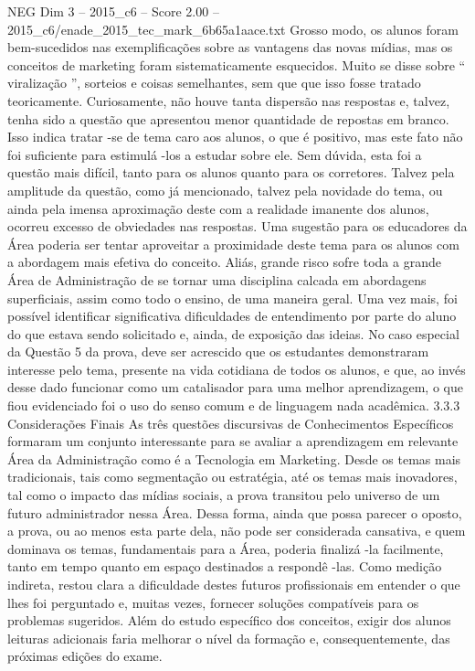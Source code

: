 \begin{textsample}{NEG Dim 3 – 2015\_c6 – Score 2.00 – 2015\_c6/enade\_2015\_tec\_mark\_6b65a1aace.txt}
Grosso modo, os alunos foram bem-sucedidos nas exemplificações sobre as vantagens das novas mídias, mas os conceitos de marketing foram sistematicamente esquecidos.
Muito se disse sobre “ viralização ”, sorteios e coisas semelhantes, sem que que isso fosse tratado teoricamente.
Curiosamente, não houve tanta dispersão nas respostas e, talvez, tenha sido a questão que apresentou menor quantidade de repostas em branco.
Isso indica tratar -se de tema caro aos alunos, o que é positivo, mas este fato não foi suficiente para estimulá -los a estudar sobre ele.
Sem dúvida, esta foi a questão mais difícil, tanto para os alunos quanto para os corretores.
Talvez pela amplitude da questão, como já mencionado, talvez pela novidade do tema, ou ainda pela imensa aproximação deste com a realidade imanente dos alunos, ocorreu excesso de obviedades nas respostas.
Uma sugestão para os educadores da Área poderia ser tentar aproveitar a proximidade deste tema para os alunos com a abordagem mais efetiva do conceito.
Aliás, grande risco sofre toda a grande Área de Administração de se tornar uma disciplina calcada em abordagens superficiais, assim como todo o ensino, de uma maneira geral.
Uma vez mais, foi possível identificar significativa dificuldades de entendimento por parte do aluno do que estava sendo solicitado e, ainda, de exposição das ideias.
No caso especial da Questão 5 da prova, deve ser acrescido que os estudantes demonstraram interesse pelo tema, presente na vida cotidiana de todos os alunos, e que, ao invés desse dado funcionar como um catalisador para uma melhor aprendizagem, o que fiou evidenciado foi o uso do senso comum e de linguagem nada acadêmica. 3.3.3 Considerações Finais As três questões discursivas de Conhecimentos Específicos formaram um conjunto interessante para se avaliar a aprendizagem em relevante Área da Administração como é a Tecnologia em Marketing.
Desde os temas mais tradicionais, tais como segmentação ou estratégia, até os temas mais inovadores, tal como o impacto das mídias sociais, a prova transitou pelo universo de um futuro administrador nessa Área.
Dessa forma, ainda que possa parecer o oposto, a prova, ou ao menos esta parte dela, não pode ser considerada cansativa, e quem dominava os temas, fundamentais para a Área, poderia finalizá -la facilmente, tanto em tempo quanto em espaço destinados a respondê -las.
Como medição indireta, restou clara a dificuldade destes futuros profissionais em entender o que lhes foi perguntado e, muitas vezes, fornecer soluções compatíveis para os problemas sugeridos.
Além do estudo específico dos conceitos, exigir dos alunos leituras adicionais faria melhorar o nível da formação e, consequentemente, das próximas edições do exame.

\end{textsample}
